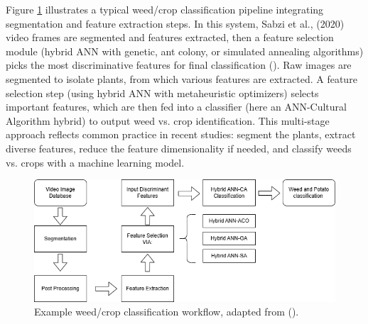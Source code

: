 \documentclass[letterpaper, notitlepage]{report}
\begin{document}
Figure \ref{fig:workflow-sabzi} illustrates a typical weed/crop classification pipeline integrating segmentation and feature extraction steps. In this system, Sabzi et al., (2020)  video frames are segmented  and  features extracted, then a feature selection module (hybrid ANN with genetic, ant colony, or simulated annealing algorithms) picks the most discriminative features for final classification (\cite{Sabzi2020-af}). Raw images are segmented to isolate plants, from which various features are extracted. A feature selection step (using hybrid ANN with metaheuristic optimizers) selects important features, which are then fed into a classifier (here an ANN-Cultural Algorithm hybrid) to output weed vs. crop identification. This multi-stage approach reflects common practice in recent studies: segment the plants, extract diverse features, reduce the feature dimensionality if needed, and classify weeds vs. crops with a machine learning model.

\begin{figure}[h!]
	\centering
	\includegraphics[width=0.9\linewidth]{./figures/sabzi-workflow.png}
	\caption[Color correction target and image set identification]{Example weed/crop classification workflow, adapted from \citeauthor{Sabzi2020-af} (\citeyear{Sabzi2020-af}).}
	\label{fig:workflow-sabzi}
\end{figure}

%
\end{document}

